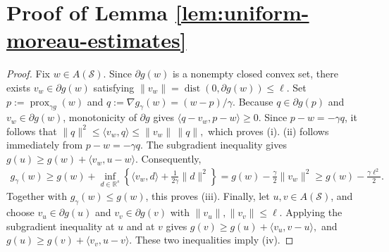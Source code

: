 \documentclass[11pt]{article}
\numberwithin{equation}{section}
\newcommand{\R}{\mathbb{R}}
\newcommand{\dist}{\operatorname{dist}}
\newcommand{\prox}{\operatorname{prox}}
\begin{document}
\appendix
\section{Proof of Lemma \ref{lem:uniform-moreau-estimates}}\label{appA}

\begin{proof}
Fix $w\in A(\mathcal S)$. Since $\partial g(w)$ is a nonempty closed convex
set, there exists $v_w\in\partial g(w)$ satisfying
$
\|v_w\|=\dist(0,\partial g(w))\leq\ell.$
Set $p:=\prox_{\gamma g}(w)$ and
$q:=\nabla g_\gamma(w)=(w-p)/\gamma$. Because
$q\in\partial g(p)$ and $v_w\in\partial g(w)$, monotonicity of $\partial g$
gives
$
\langle q-v_w,p-w\rangle\geq0.$
Since $p-w=-\gamma q$, it follows that
$
\|q\|^2\leq\langle v_w,q\rangle
\leq\|v_w\|\,\|q\|,$
which proves (i). (ii) follows immediately from
$p-w=-\gamma q$.
The subgradient inequality gives
$
g(u)\geq g(w)+\langle v_w,u-w\rangle.
$
Consequently,
\begin{eqnarray*}
g_\gamma(w)
\geq g(w)+\inf_{d\in\R^s}
\left\{\langle v_w,d\rangle+\frac{1}{2\gamma}\|d\|^2\right\}
=g(w)-\frac{\gamma}{2}\|v_w\|^2
\geq g(w)-\frac{\gamma\ell^2}{2}.
\end{eqnarray*}
Together with $g_\gamma(w)\leq g(w)$, this proves
(iii).
Finally, let $u,v\in A(\mathcal S)$, and choose
$v_u\in\partial g(u)$ and $v_v\in\partial g(v)$ with
$\|v_u\|,\|v_v\|\leq\ell$. Applying the subgradient inequality at $u$ and
at $v$ gives
$
g(v)\geq g(u)+\langle v_u,v-u\rangle,$ and
$
g(u)\geq g(v)+\langle v_v,u-v\rangle.
$
These two inequalities imply (iv).
\end{proof}
\end{document}
